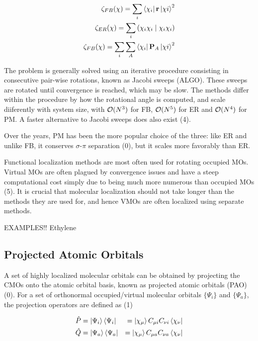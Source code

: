 \begin{eqnarray}
\zeta_{FB}(\chi) = \sum_i \bra{\chi_i} \mathbf{r} \ket{\chi i}^2 \\
\zeta_{ER}(\chi) = \sum_i \left( \chi_i \chi_i \mid \chi_i \chi_i \right) \\
\zeta_{FB}(\chi) = \sum_i \sum_A \bra{\chi_i} \mathbf{P}_A \ket{\chi i}^2 
\end{eqnarray}

The problem is generally solved using an iterative procedure consisting in consecutive pair-wise rotations, known as Jacobi sweeps (ALGO). These sweeps are rotated until convergence is reached, which may be slow. The methods differ within the procedure by how the rotational angle is computed, and scale diiferently with system size, with $\mathcal{O}(N^{3})$ for FB, $\mathcal{O}(N^{5})$ for ER and $\mathcal{O}(N^{4})$ for PM. A faster alternative to Jacobi sweeps does also exist (4). 

Over the years, PM has been the more popular choice of the three: like ER and unlike FB, it conserves $\sigma$-$\pi$ separation (0),  but it scales more favorably than ER.

Functional localization methods are most often used for rotating occupied MOs. Virtual MOs are often plagued by convergence issues and have a steep computational cost simply due to being much more numerous than occupied MOs (5). It is crucial that molecular localization should not take longer than the methods they are used for, and hence VMOs are often localized using separate methods.

EXAMPLES!! Ethylene

\subsection{Projected Atomic Orbitals}

A set of highly localized molecular orbitals can be obtained by projecting the CMOs onto the atomic orbital basis, known as projected atomic orbitals (PAO) (0). For a set of orthonormal occupied/virtual molecular orbitals $\{\Psi_i\}$ and $\{\Psi_a\}$, the projection operators are defined as (1)

\begin{eqnarray}
\hat{P} &= \ket{\Psi_i} \bra{\Psi_i} &= \ket{\chi_{\mu}} C_{\mu i} C_{\nu i} \bra{\chi_{\nu}} \\
\hat{Q} &= \ket{\Psi_a} \bra{\Psi_a} &= \ket{\chi_{\mu}} C_{\mu a} C_{\nu a} \bra{\chi_{\nu}}
\end{eqnarray}

